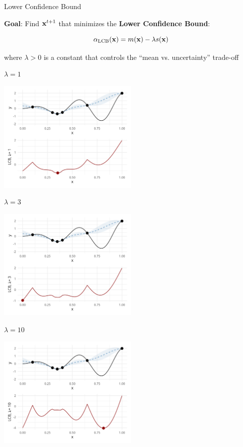 \documentclass[11pt,compress,t,notes=noshow, xcolor=table]{beamer}
\begin{document}
\begin{vbframe}{Lower Confidence Bound}

\textbf{Goal}: Find $\mathbf{x}^{t+1}$ that minimizes the \textbf{Lower Confidence Bound}:

$$
  \alpha_{\text{LCB}}(\mathbf{x}) = m(\mathbf{x}) - \lambda s(\mathbf{x})
$$

where $\lambda > 0$ is a constant that controls the \enquote{mean vs. uncertainty} trade-off

\framebreak

$\lambda = 1$

\begin{center}
  \includegraphics[width = 0.5\textwidth]{figure_man/bayesian_loop_lcb_0.png}
\end{center}

\framebreak

$\lambda = 3$

\begin{center}
  \includegraphics[width = 0.5\textwidth]{figure_man/bayesian_loop_lcb_1.png}
\end{center}

\framebreak

$\lambda = 10$

\begin{center}
  \includegraphics[width = 0.5\textwidth]{figure_man/bayesian_loop_lcb_2.png}
\end{center}

\end{vbframe}
\end{document}
